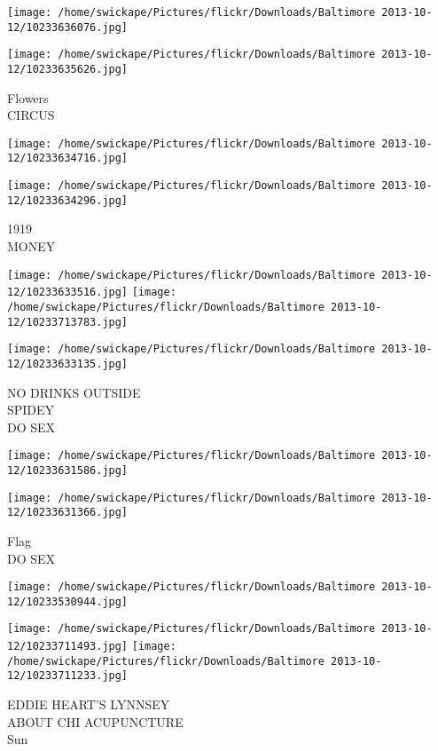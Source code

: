 \documentclass[10pt,letterpaper]{article}
\begin{document}
\texttt{[image: /home/swickape/Pictures/flickr/Downloads/Baltimore 2013-10-12/10233636076.jpg]}

\vspace{0.25in}
\texttt{[image: /home/swickape/Pictures/flickr/Downloads/Baltimore 2013-10-12/10233635626.jpg]}

Flowers\\
CIRCUS
\pagebreak

\texttt{[image: /home/swickape/Pictures/flickr/Downloads/Baltimore 2013-10-12/10233634716.jpg]}

\vspace{0.25in}
\texttt{[image: /home/swickape/Pictures/flickr/Downloads/Baltimore 2013-10-12/10233634296.jpg]}

1919\\
MONEY
\pagebreak

\texttt{[image: /home/swickape/Pictures/flickr/Downloads/Baltimore 2013-10-12/10233633516.jpg]}
\texttt{[image: /home/swickape/Pictures/flickr/Downloads/Baltimore 2013-10-12/10233713783.jpg]}

\texttt{[image: /home/swickape/Pictures/flickr/Downloads/Baltimore 2013-10-12/10233633135.jpg]}

NO DRINKS OUTSIDE\\
SPIDEY\\
DO SEX
\pagebreak

\texttt{[image: /home/swickape/Pictures/flickr/Downloads/Baltimore 2013-10-12/10233631586.jpg]}

\vspace{0.25in}
\texttt{[image: /home/swickape/Pictures/flickr/Downloads/Baltimore 2013-10-12/10233631366.jpg]}

Flag\\
DO SEX
\pagebreak

\texttt{[image: /home/swickape/Pictures/flickr/Downloads/Baltimore 2013-10-12/10233530944.jpg]}

\vspace{0.25in}
\texttt{[image: /home/swickape/Pictures/flickr/Downloads/Baltimore 2013-10-12/10233711493.jpg]}
\texttt{[image: /home/swickape/Pictures/flickr/Downloads/Baltimore 2013-10-12/10233711233.jpg]}

EDDIE HEART'S LYNNSEY\\
ABOUT CHI ACUPUNCTURE\\
Sun
\pagebreak
\end{document}
